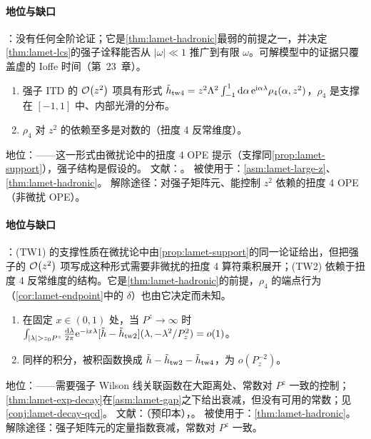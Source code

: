 \paragraph{地位与缺口}
\tagC：没有任何全阶论证；它是\cref{thm:lamet-hadronic}最弱的前提之一，并决定\cref{thm:lamet-lcs}的强子诠释能否从 $|\omega|\ll1$ 推广到有限 $\omega$。可解模型中的证据只覆盖虚的 Ioffe 时间（第~23~章）。

\begin{assumption}\label{asm:lamet-twist4}
\begin{enumerate}[label=(TW\arabic*),leftmargin=3.4em,itemsep=1pt,topsep=2pt]
\item 强子 ITD 的 $\mathcal{O}\!\left(z^2\right)$ 项具有形式 $\tilde h_{\rm tw4}=z^2\Lambda^2\int_{-1}^1\mathrm{d}\alpha\,\mathrm{e}^{\mathrm{i}\alpha\lambda}\rho_4(\alpha,z^2)$，$\rho_4$ 是支撑在 $[-1,1]$ 中、内部光滑的分布。
\item $\rho_4$ 对 $z^2$ 的依赖至多是对数的（扭度 4 反常维度）。
\end{enumerate}
地位：\tagC——这一形式由微扰论中的扭度 4 OPE 提示（支撑同\cref{prop:lamet-support}），强子结构是假设的。
文献：\cite{Braun:2018brg,Radyushkin2017,JiEtAl2021}。
被使用于：\cref{asm:lamet-large-z}、\cref{thm:lamet-hadronic}。
解除途径：对强子矩阵元、能控制 $z^2$ 依赖的扭度 4 OPE（非微扰 OPE）。
\end{assumption}

\paragraph{地位与缺口}
\tagC：(TW1) 的支撑性质在微扰论中由\cref{prop:lamet-support}的同一论证给出，但把强子的 $\mathcal{O}\!\left(z^2\right)$ 项写成这种形式需要非微扰的扭度 4 算符乘积展开；(TW2) 依赖于扭度 4 反常维度的结构。它是\cref{thm:lamet-hadronic}的前提，$\rho_4$ 的端点行为（\cref{cor:lamet-endpoint}中的 $\delta$）也由它决定而未知。

\begin{assumption}\label{asm:lamet-large-z}
\begin{enumerate}[label=(LZ\arabic*),leftmargin=3.4em,itemsep=1pt,topsep=2pt]
\item 在固定 $x\in(0,1)$ 处，当 $P^z\to\infty$ 时 $\int_{|\lambda|>z_0P^z}\frac{\dd\lambda}{2\pi}\ee^{-\ii x\lambda}[\tilde h-\tilde h_{\rm tw2}](\lambda,-\lambda^2/P_z^2)=o(1)$。
\item 同样的积分，被积函数换成 $\tilde h-\tilde h_{\rm tw2}-\tilde h_{\rm tw4}$，为 $o(P_z^{-2})$。
\end{enumerate}
地位：\tagC——需要强子 Wilson 线关联函数在大距离处、常数对 $P^z$ 一致的控制；\cref{thm:lamet-exp-decay}在\cref{asm:lamet-gap}之下给出衰减，但没有可用的常数；见\cref{conj:lamet-decay-qcd}。
文献：\cite{Ji:2026vir}（预印本），\cite{JiEtAl2021,Gao:2021dbh}。
被使用于：\cref{thm:lamet-hadronic}。
解除途径：强子矩阵元的定量指数衰减，常数对 $P^z$ 一致。
\end{assumption}


